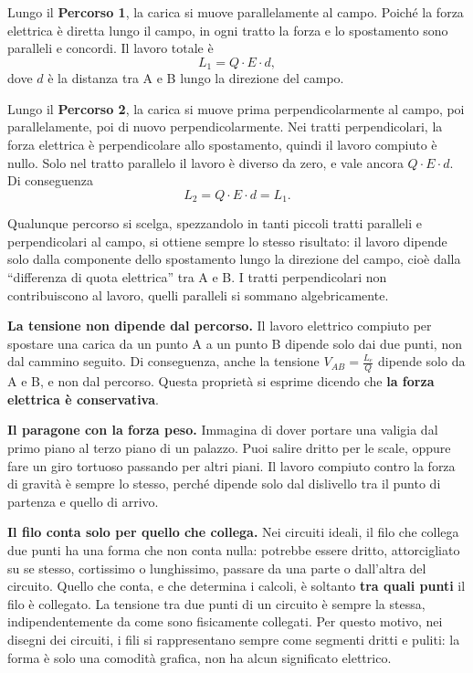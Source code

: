 Lungo il \textbf{Percorso 1}, la carica si muove parallelamente al campo. Poiché la forza elettrica è diretta lungo il campo, in ogni tratto la forza e lo spostamento sono paralleli e concordi. Il lavoro totale è
\[
L_1 = Q \cdot E \cdot d,
\]
dove \(d\) è la distanza tra A e B lungo la direzione del campo.

Lungo il \textbf{Percorso 2}, la carica si muove prima perpendicolarmente al campo, poi parallelamente, poi di nuovo perpendicolarmente. Nei tratti perpendicolari, la forza elettrica è perpendicolare allo spostamento, quindi il lavoro compiuto è nullo. Solo nel tratto parallelo il lavoro è diverso da zero, e vale ancora \(Q \cdot E \cdot d\). Di conseguenza
\[
L_2 = Q \cdot E \cdot d = L_1.
\]

Qualunque percorso si scelga, spezzandolo in tanti piccoli tratti paralleli e perpendicolari al campo, si ottiene sempre lo stesso risultato: il lavoro dipende solo dalla componente dello spostamento lungo la direzione del campo, cioè dalla ``differenza di quota elettrica'' tra A e B. I tratti perpendicolari non contribuiscono al lavoro, quelli paralleli si sommano algebricamente.

\begin{concetto}
\textbf{La tensione non dipende dal percorso.} Il lavoro elettrico compiuto per spostare una carica da un punto A a un punto B dipende solo dai due punti, non dal cammino seguito. Di conseguenza, anche la tensione \(V_{AB} = \frac{L_e}{Q}\) dipende solo da A e B, e non dal percorso. Questa proprietà si esprime dicendo che \textbf{la forza elettrica è conservativa}.
\end{concetto}

\begin{esempio}
\textbf{Il paragone con la forza peso.} Immagina di dover portare una valigia dal primo piano al terzo piano di un palazzo. Puoi salire dritto per le scale, oppure fare un giro tortuoso passando per altri piani. Il lavoro compiuto contro la forza di gravità è sempre lo stesso, perché dipende solo dal dislivello tra il punto di partenza e quello di arrivo.
\end{esempio}

\begin{concetto}
\textbf{Il filo conta solo per quello che collega.} Nei circuiti ideali, il filo che collega due punti ha una forma che non conta nulla: potrebbe essere dritto, attorcigliato su se stesso, cortissimo o lunghissimo, passare da una parte o dall'altra del circuito. Quello che conta, e che determina i calcoli, è soltanto \textbf{tra quali punti} il filo è collegato. La tensione tra due punti di un circuito è sempre la stessa, indipendentemente da come sono fisicamente collegati. Per questo motivo, nei disegni dei circuiti, i fili si rappresentano sempre come segmenti dritti e puliti: la forma è solo una comodità grafica, non ha alcun significato elettrico.
\end{concetto}

